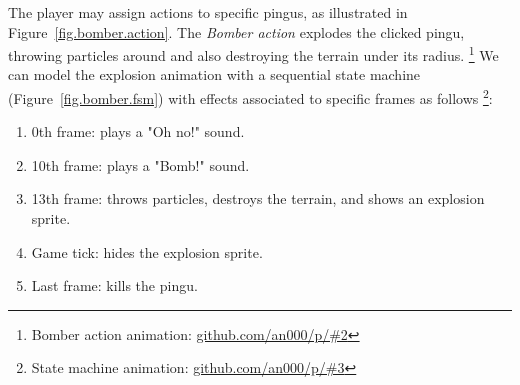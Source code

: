 \documentclass[10pt, conference, compsocconf]{IEEEtran}
\begin{document}
The player may assign actions to specific pingus, as illustrated in
Figure~\ref{fig.bomber.action}.
%
The \emph{Bomber action} explodes the clicked pingu, throwing particles around
and also destroying the terrain under its radius.%
\footnote{Bomber action animation: \url{github.com/an000/p/#2} }
%
We can model the explosion animation with a sequential state machine
(Figure~\ref{fig.bomber.fsm}) with effects associated to specific frames as
follows%
\footnote{State machine animation: \url{github.com/an000/p/#3} }:
%
\begin{enumerate}
\item 0th frame:  plays a "Oh no!" sound.
\item 10th frame: plays a "Bomb!" sound.
\item 13th frame: throws particles, destroys the terrain, and shows an
                  explosion sprite.
\item Game tick:  hides the explosion sprite.
\item Last frame: kills the pingu.
\end{enumerate}

\end{document}
